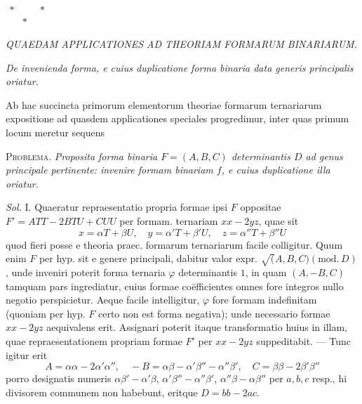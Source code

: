 \begin{center}
$\begin{array}{ccc}*&\quad&*\\&*&\end{array}$
\end{center}

\begin{center}
\textit{QUAEDAM APPLICATIONES AD THEORIAM FORMARUM BINARIARUM.}
\end{center}

\begin{center}
\textit{De invenienda forma, e cuius duplicatione forma binaria data generis principalis oriatur.}
\end{center}

Ab hac succincta primorum elementorum theoriae formarum ternariarum expositione ad quasdem applicationes speciales progredimur, inter quas primum locum meretur sequens

\textsc{Problema.} \textit{Proposita forma binaria $F=(A,B,C)$ determinantis $D$ ad genus principale pertinente: invenire formam binariam $f$, e cuius duplicatione illa oriatur.}

\textit{Sol.} I. Quaeratur repraesentatio propria formae ipsi $F$ oppositae $F'=ATT-2BTU+CUU$ per formam. ternariam $xx-2yz$, quae sit
\[
x=\alpha T+\beta U,\quad y=\alpha'T+\beta'U,\quad z=\alpha''T+\beta''U
\]
quod fieri posse e theoria praec. formarum ternariarum facile colligitur. Quum enim $F$ per hyp. sit e genere principali, dabitur valor expr. $\surd(A,\allowbreak B,\allowbreak C)(\mathrm{mod.}\,\allowbreak D)$, unde inveniri poterit forma ternaria $\varphi$ determinantis $1$, in quam $(A,-B,C)$ tamquam pars ingrediatur, cuius formae coëfficientes omnes fore integros nullo negotio perspicietur. Aeque facile intelligitur, $\varphi$ fore formam indefinitam (quoniam per hyp. $F$ certo non est forma negativa); unde necessario formae $xx-2yz$ aequivalens erit. Assignari poterit itaque transformatio huius in illam, quae repraesentationem propriam formae $F'$ per $xx-2yz$ suppeditabit. --- Tunc igitur erit
\[
A=\alpha\alpha-2\alpha'\alpha'',\quad -B=\alpha\beta-\alpha'\beta''-\alpha''\beta',\quad C=\beta\beta-2\beta'\beta''
\]
porro designatis numeris $\alpha\beta'-\alpha'\beta$, $\alpha'\beta''-\alpha''\beta'$, $\alpha''\beta-\alpha\beta''$ per $a,b,c$ resp., hi divisorem communem non habebunt, eritque $D=bb-2ac$.

